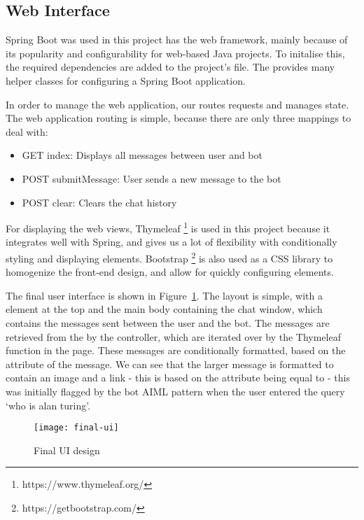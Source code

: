 \subsection{Web Interface}
Spring Boot \cite{springmanual} was used in this project has the web framework, mainly because of its popularity and configurability for web-based Java projects. To initalise this, the required dependencies are added to the project's  file. The  provides many helper classes for configuring a Spring Boot application.

In order to manage the web application, our  routes requests and manages state. The web application routing is simple, because there are only three mappings to deal with:
\begin{itemize}
	\item GET index: Displays all messages between user and bot
	\item POST submitMessage: User sends a new message to the bot
	\item POST clear: Clears the chat history
\end{itemize}

For displaying the web views, Thymeleaf \footnote{https://www.thymeleaf.org/} is used in this project because it integrates well with Spring, and gives us a lot of flexibility with conditionally styling and displaying elements. Bootstrap \footnote{https://getbootstrap.com/} is also used as a CSS library to homogenize the front-end design, and allow for quickly configuring elements.

The final user interface is shown in Figure~\ref{fig:final-ui}. The layout is simple, with a  element at the top and the main body containing the chat window, which contains the messages sent between the user and the bot. The messages are retrieved from the  by the controller, which are iterated over by the Thymeleaf function in the  page. These messages are conditionally formatted, based on the  attribute of the message. We can see that the larger message is formatted to contain an image and a link - this is based on the  attribute being equal to  - this was initially flagged by the bot AIML pattern when the user entered the query `who is alan turing'.

\begin{figure}[h]
	\centering
	\texttt{[image: final-ui]}
	\caption{Final UI design}
	\label{fig:final-ui}
\end{figure}


